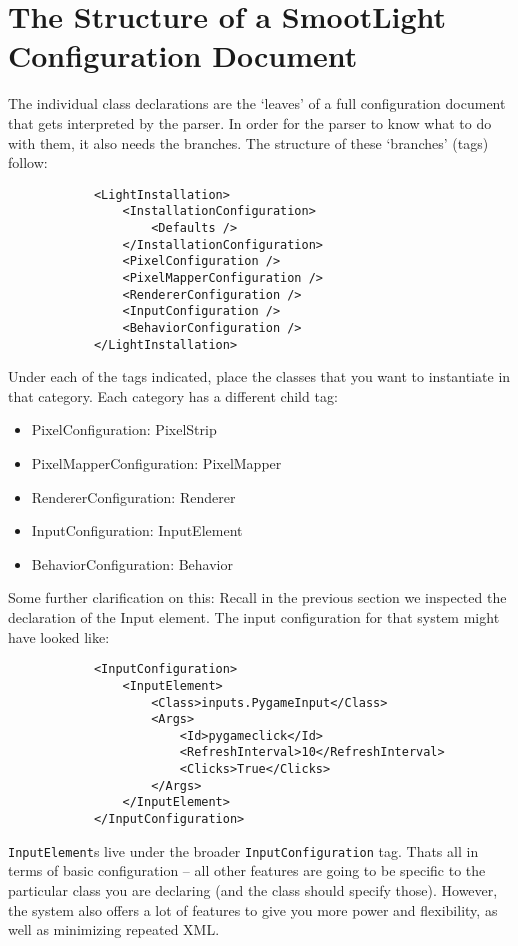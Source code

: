 \documentclass{article}
\begin{document}
    \section{The Structure of a SmootLight Configuration Document}
        The individual class declarations are the `leaves' of a full configuration document that
        gets interpreted by the parser.  In order for the parser to know what to do with them, it
        also needs the branches.  The structure of these `branches' (tags) follow:
        \begin{verbatim}
            <LightInstallation>
                <InstallationConfiguration>
                    <Defaults />
                </InstallationConfiguration>
                <PixelConfiguration />
                <PixelMapperConfiguration />
                <RendererConfiguration />
                <InputConfiguration />
                <BehaviorConfiguration />
            </LightInstallation>
        \end{verbatim}
        Under each of the tags indicated, place the classes that you want to instantiate in that
        category.  Each category has a different child tag:
        \begin{itemize}
            \item PixelConfiguration: PixelStrip
            \item PixelMapperConfiguration: PixelMapper
            \item RendererConfiguration: Renderer
            \item InputConfiguration: InputElement
            \item BehaviorConfiguration: Behavior
        \end{itemize}
        Some further clarification on this: Recall in the previous section we inspected the
        declaration of the Input element.  The input configuration for that system might have looked
        like:
        \begin{verbatim}
            <InputConfiguration> 
                <InputElement>
                    <Class>inputs.PygameInput</Class>
                    <Args>
                        <Id>pygameclick</Id>
                        <RefreshInterval>10</RefreshInterval>
                        <Clicks>True</Clicks>
                    </Args>
                </InputElement>
            </InputConfiguration>
        \end{verbatim}
        \texttt{InputElement}s live under the broader \texttt{InputConfiguration} tag.  Thats all in
        terms of basic configuration -- all other features are going to be specific to the
        particular class you are declaring (and the class should specify those).  However, the
        system also offers a lot of features to give you more power and flexibility, as well as
        minimizing repeated XML.
\end{document}
